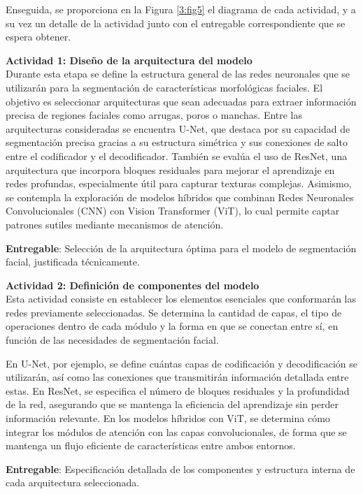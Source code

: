  Enseguida, se proporciona en la Figura \ref{3:fig5} el diagrama de cada actividad, y a su vez un detalle de la actividad junto con el entregable correspondiente que se espera obtener.
 
 \textbf{Actividad 1: Diseño de la arquitectura del modelo}
 \\
 Durante esta etapa se define la estructura general de las redes neuronales que se utilizarán para la segmentación de características morfológicas faciales. El objetivo es seleccionar arquitecturas que sean adecuadas para extraer información precisa de regiones faciales como arrugas, poros o manchas.
 Entre las arquitecturas consideradas se encuentra U-Net, que destaca por su capacidad de segmentación precisa gracias a su estructura simétrica y sus conexiones de salto entre el codificador y el decodificador. También se evalúa el uso de ResNet, una arquitectura que incorpora bloques residuales para mejorar el aprendizaje en redes profundas, especialmente útil para capturar texturas complejas. Asimismo, se contempla la exploración de modelos híbridos que combinan Redes Neuronales Convolucionales (CNN) con Vision Transformer (ViT), lo cual permite captar patrones sutiles mediante mecanismos de atención.
 
 \textbf{Entregable}: Selección de la arquitectura óptima para el modelo de segmentación facial, justificada técnicamente.

 \textbf{Actividad 2: Definición de componentes del modelo}
 \\
Esta actividad consiste en establecer los elementos esenciales que conformarán las redes previamente seleccionadas. Se determina la cantidad de capas, el tipo de operaciones dentro de cada módulo y la forma en que se conectan entre sí, en función de las necesidades de segmentación facial.

En U-Net, por ejemplo, se define cuántas capas de codificación y decodificación se utilizarán, así como las conexiones que transmitirán información detallada entre estas. En ResNet, se especifica el número de bloques residuales y la profundidad de la red, asegurando que se mantenga la eficiencia del aprendizaje sin perder información relevante. En los modelos híbridos con ViT, se determina cómo integrar los módulos de atención con las capas convolucionales, de forma que se mantenga un flujo eficiente de características entre ambos entornos.

 \textbf{Entregable}: Especificación detallada de los componentes y estructura interna de cada arquitectura seleccionada.


